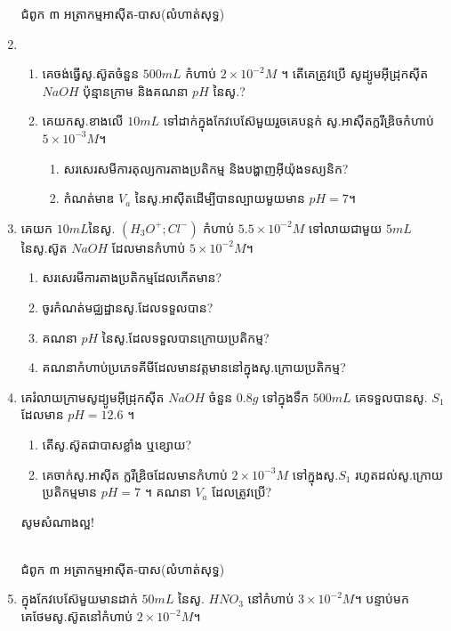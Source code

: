 \documentclass[12pt, a4paper]{article}
\begin{document}
\begin{enumerate}[m]
\begin{center}
		ជំពូក ៣ អត្រាកម្មអាស៊ីត-បាស(លំហាត់សុទ្ធ)
	\end{center}
	\item \begin{enumerate}[k]
		\item គេចង់ធ្វើសូ.ស៊ូតចំនួន $500mL$ កំហាប់ $2\times10^{-2}M$ ។ តើគេត្រូវប្រើ សូដ្យូមអ៊ីដ្រុកស៊ីត $NaOH$ ប៉ុន្មានក្រាម និងគណនា $pH$ នៃសូ.?
		\item គេយកសូ.ខាងលើ $10mL$ ទៅដាក់ក្នុងកែវបេស៊ែមួយរួចគេបន្តក់ សូ.អាស៊ីតក្លរីឌ្រិចកំហាប់ $5\times10^{-3}M$។
		\begin{enumerate}[a]
			\item សរសេរសមីការតុល្យការតាងប្រតិកម្ម និងបង្ហាញអ៊ីយ៉ុងទស្យនិក?
			\item កំណត់មាឌ $V_a$ នៃសូ.អាស៊ីតដើម្បីបានល្បាយមួយមាន $pH=7$។
		\end{enumerate}
	\end{enumerate}
	\item គេយក $10mL$នៃសូ. $(H_3O^+ ; Cl^-)$ កំហាប់ $5.5\times10^{-2}M$ ទៅលាយជាមួយ $5mL$ នៃសូ.ស៊ូត $NaOH$ ដែលមានកំហាប់ $5\times10^{-2}M$។
	\begin{enumerate}[k]
		\item សរសេរមីការតាងប្រតិកម្មដែលកើតមាន?
		\item ចូរកំណត់មជ្ឈដ្ឋានសូ.ដែលទទួលបាន?
		\item គណនា $pH$ នៃសូ.ដែលទទួលបានក្រោយប្រតិកម្ម?
		\item គណនាកំហាប់ប្រភេទគីមីដែលមានវត្តមាននៅក្នុងសូ.ក្រោយប្រតិកម្ម?
	\end{enumerate}
	\item គេរំលាយក្រាមសូដ្យូមអ៊ីដ្រុកស៊ីត $NaOH$ ចំនួន $0.8g$ ទៅក្នុងទឹក $500mL$ គេទទួលបានសូ. $S_1$ ដែលមាន $pH=12.6$ ។
	\begin{enumerate}[k]
		\item តើសូ.ស៊ូតជាបាសខ្លាំង ឬខ្សោយ?
		\item គេចាក់សូ.អាស៊ីត ក្លរីឌ្រិចដែលមានកំហាប់ $2\times10^{-3}M$ ទៅក្នុងសូ.$S_1$ រហូតដល់សូ.ក្រោយប្រតិកម្មមាន $pH=7$ ។ គណនា $V_a$ ដែលត្រូវប្រើ?
	\end{enumerate}
	\begin{center}
		\sffamily\color{black}
		សូមសំណាងល្អ!
	\end{center}\newpage
	\begin{center}
		\sffamily\color{black}
		\\
		ជំពូក ៣ អត្រាកម្មអាស៊ីត-បាស(លំហាត់សុទ្ធ)
	\end{center}
	\item ក្នុងកែវបេស៊ែមួយមានដាក់ $50mL$ នៃសូ. $HNO_3$ នៅកំហាប់ $3\times10^{-2}M$។ បន្ទាប់មកគេថែមសូ.ស៊ូតនៅកំហាប់ $2\times10^{-2}M$។

\end{enumerate}
\end{document}
